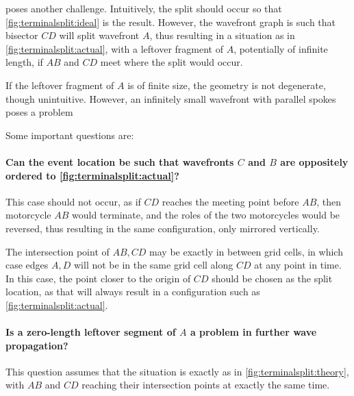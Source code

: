 \documentclass[12pt,a4paper,oneside,openany]{article}
\begin{document}
 poses another challenge. Intuitively, the split should occur so that \cref{fig:terminalsplit:ideal} is the result. However, the wavefront graph is such that bisector $CD$ will split wavefront $A$, thus resulting in a situation as in \cref{fig:terminalsplit:actual}, with a leftover fragment of $A$, potentially of infinite length, if $AB$ and $CD$ meet where the split would occur.

If the leftover fragment of $A$ is of finite size, the geometry is not degenerate, though unintuitive. However, an infinitely small wavefront with parallel spokes poses a problem

Some important questions are:

\paragraph{Can the event location be such that wavefronts $C$ and $B$ are oppositely ordered to \cref{fig:terminalsplit:actual}?} This case should not occur, as if $CD$ reaches the meeting point before $AB$, then motorcycle $AB$ would terminate, and the roles of the two motorcycles would be reversed, thus resulting in the same configuration, only mirrored vertically.

The intersection point of $AB,CD$ may be exactly in between grid cells, in which case edges $A,D$ will not be in the same grid cell along $CD$ at any point in time. In this case, the point closer to the origin of $CD$ should be chosen as the split location, as that will always result in a configuration such as \cref{fig:terminalsplit:actual}.

\paragraph{Is a zero-length leftover segment of $A$ a problem in further wave propagation?} This question assumes that the situation is exactly as in \cref{fig:terminalsplit:theory}, with $AB$ and $CD$ reaching their intersection points at exactly the same time.
\end{document}
